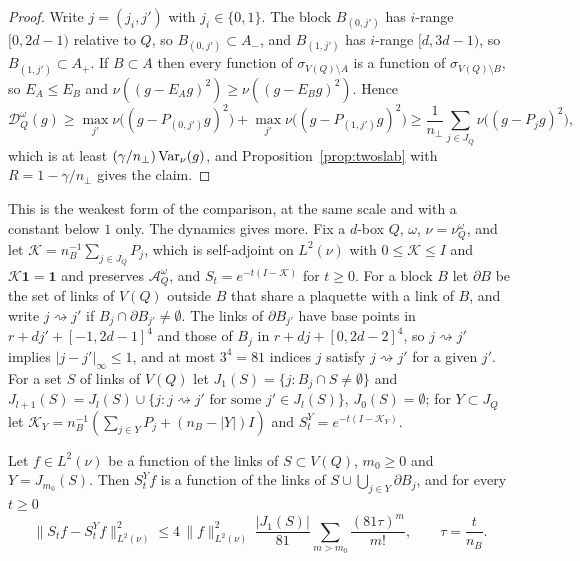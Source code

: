 \begin{proof}
Write $j=(j_i,j')$ with $j_i\in\{0,1\}$. The block $B_{(0,j')}$ has
$i$-range $[0,2d-1)$ relative to $Q$, so $B_{(0,j')}\subset A_-$, and
$B_{(1,j')}$ has $i$-range $[d,3d-1)$, so $B_{(1,j')}\subset A_+$. If
$B\subset A$ then every function of $\sigma_{V(Q)\setminus A}$ is a function
of $\sigma_{V(Q)\setminus B}$, so $E_A\le E_B$ and $\nu((g-E_Ag)^2)\ge
\nu((g-E_Bg)^2)$. Hence
\[
\mathcal D^\omega_Q(g)\ge\max_{j'}\nu\bigl((g-P_{(0,j')}g)^2\bigr)+\max_{j'}
\nu\bigl((g-P_{(1,j')}g)^2\bigr)\ge\frac1{n_\perp}\sum_{j\in J_Q}\nu\bigl((g-
P_jg)^2\bigr),
\]
which is at least $(\gamma/n_\perp)\operatorname{Var}_\nu(g)$,
and Proposition~\ref{prop:twoslab} with $R=1-\gamma/n_\perp$ gives the claim.
\end{proof}

This is the weakest form of the comparison, at the same scale and with a
constant below $1$ only. The dynamics gives more. Fix a $d$-box $Q$, $\omega$,
$\nu=\nu^\omega_Q$, and let $\mathcal K=n_B^{-1}\sum_{j\in J_Q}P_j$, which is
self-adjoint on $L^2(\nu)$ with $0\le\mathcal K\le I$ and $\mathcal K\mathbf1=
\mathbf1$ and preserves $\mathcal A^\omega_Q$, and $S_t=e^{-t(I-\mathcal K)}$
for $t\ge0$. For a block $B$ let $\partial B$ be the set of links of $V(Q)$
outside $B$ that share a plaquette with a link of $B$, and write
$j\rightsquigarrow j'$ if $B_j\cap\partial B_{j'}\ne\emptyset$. The links of
$\partial B_{j'}$ have base points in $r+dj'+[-1,2d-1]^4$ and those of $B_j$
in $r+dj+[0,2d-2]^4$, so $j\rightsquigarrow j'$ implies $|j-j'|_\infty\le1$,
and at most $3^4=81$ indices $j$ satisfy $j\rightsquigarrow j'$ for a given
$j'$. For a set $S$ of links of $V(Q)$ let $J_1(S)=\{j:B_j\cap S\ne\emptyset
\}$ and $J_{l+1}(S)=J_l(S)\cup\{j:j\rightsquigarrow j'\text{ for some }j'\in
J_l(S)\}$, $J_0(S)=\emptyset$; for $Y\subset J_Q$ let $\mathcal K_Y=n_B^{-1}
(\sum_{j\in Y}P_j+(n_B-|Y|)I)$ and $S^Y_t=e^{-t(I-\mathcal K_Y)}$.

\begin{lemma}\label{lem:blockspeed}
Let $f\in L^2(\nu)$ be a function of the links of $S\subset V(Q)$, $m_0\ge0$
and $Y=J_{m_0}(S)$. Then $S^Y_tf$ is a function of the links of
$S\cup\bigcup_{j\in Y}\partial B_j$, and for every $t\ge0$
\[
\|S_tf-S^Y_tf\|^2_{L^2(\nu)}\le4\,\|f\|^2_{L^2(\nu)}\,\frac{|J_1(S)|}{81}
\sum_{m>m_0}\frac{(81\tau)^m}{m!},\qquad\tau=\frac t{n_B}.
\]
\end{lemma}

